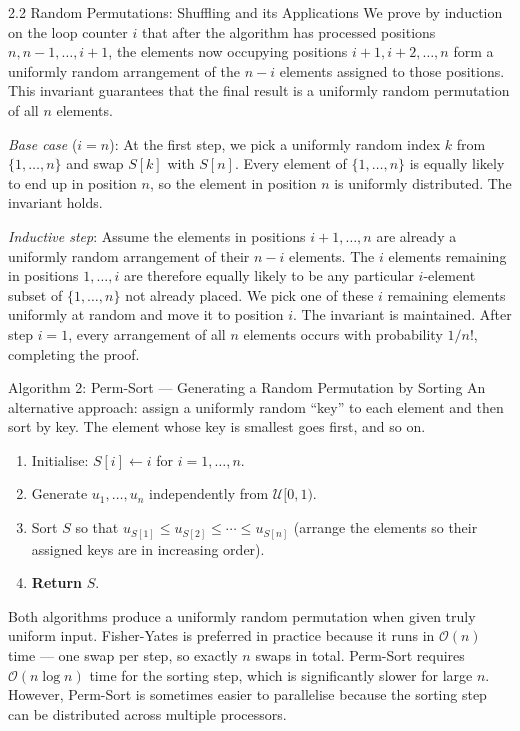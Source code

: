\documentclass[aspectratio=169,10pt]{beamer}
\begin{document}
\begin{frame}[allowframebreaks]{2.2 Random Permutations: Shuffling and its Applications}
We prove by induction on the loop counter $i$ that after the algorithm has
processed positions $n, n-1, \ldots, i+1$, the elements now occupying positions
$i+1, i+2, \ldots, n$ form a uniformly random arrangement of the $n-i$ elements
assigned to those positions.  This invariant guarantees that the final result
is a uniformly random permutation of all $n$ elements.

\emph{Base case} ($i = n$): At the first step, we pick a uniformly random
index $k$ from $\{1,\ldots,n\}$ and swap $S[k]$ with $S[n]$.  Every element
of $\{1,\ldots,n\}$ is equally likely to end up in position $n$, so the
element in position $n$ is uniformly distributed.  The invariant holds.

\emph{Inductive step}: Assume the elements in positions $i+1, \ldots, n$ are
already a uniformly random arrangement of their $n-i$ elements.  The $i$
elements remaining in positions $1, \ldots, i$ are therefore equally likely to
be any particular $i$-element subset of $\{1,\ldots,n\}$ not already placed.
We pick one of these $i$ remaining elements uniformly at random and move it to
position $i$.  The invariant is maintained.  After step $i=1$, every
arrangement of all $n$ elements occurs with probability $1/n!$, completing the
proof.

\begin{block}{Algorithm 2: Perm-Sort --- Generating a Random Permutation by Sorting}
An alternative approach: assign a uniformly random ``key'' to each element and
then sort by key.  The element whose key is smallest goes first, and so on.
\begin{enumerate}
  \item Initialise: $S[i] \leftarrow i$ for $i = 1,\ldots,n$.
  \item Generate $u_1,\ldots,u_n$ independently from $\mathcal{U}[0,1)$.
  \item Sort $S$ so that $u_{S[1]} \le u_{S[2]} \le \cdots \le u_{S[n]}$
    (arrange the elements so their assigned keys are in increasing order).
  \item \textbf{Return} $S$.
\end{enumerate}
\end{block}

Both algorithms produce a uniformly random permutation when given truly uniform
input.  Fisher-Yates is preferred in practice because it runs in
$\mathcal{O}(n)$ time --- one swap per step, so exactly $n$ swaps in total.
Perm-Sort requires $\mathcal{O}(n \log n)$ time for the sorting step, which is
significantly slower for large $n$.  However, Perm-Sort is sometimes easier
to parallelise because the sorting step can be distributed across multiple
processors.


\end{frame}
\end{document}
